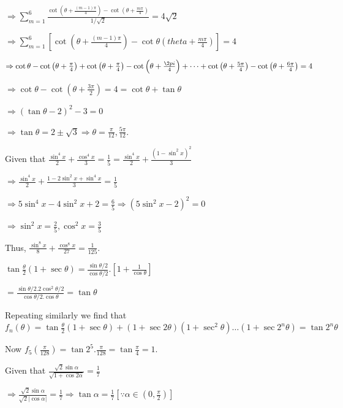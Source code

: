   $\Rightarrow \displaystyle\sum_{m = 1}^6\frac{\cot\left(\theta + \frac{(m - 1)\pi}{4}\right)
    - \cot\left(\theta + \frac{m\pi}{4}\right)}{1/\sqrt{2}} = 4\sqrt{2}$

  $\Rightarrow \displaystyle\sum_{m = 1}^6\left[\cot\left(\theta + \frac{(m - 1)\pi}{4}\right)
    - \cot\theta\left(theta + \frac{m\pi}{4}\right)\right] = 4$

  $\Rightarrow \cot\theta - \cot\left(\theta + \frac{\pi}{4}\right) + \cot\left(\theta
  + \frac{\pi}{4}\right) - \cot\left(\theta + \frac{\2pi}{4}\right) + \cdots + \cot\left(\theta
  + \frac{5\pi}{4}\right) - \cot\left(\theta + \frac{6\pi}{4}\right) = 4$

  $\Rightarrow \cot\theta - \cot\left(\theta + \frac{3\pi}{2}\right) = 4 = \cot\theta + \tan\theta$

  $\Rightarrow (\tan\theta - 2)^2 - 3 = 0$

  $\Rightarrow \tan\theta = 2\pm\sqrt{3}\Rightarrow \theta = \frac{\pi}{12}, \frac{5\pi}{12}$.
\item Given that $\frac{\sin^4x}{2} + \frac{\cos^4x}{3} = \frac{1}{5} = \frac{\sin^4x}{2} + \frac{\left(1
  - \sin^2x\right)^2}{3}$

  $\Rightarrow \frac{\sin^4x}{2} + \frac{1 - 2\sin^2x + \sin^4x}{3} = \frac{1}{5}$

  $\Rightarrow 5\sin^4x - 4\sin^2x + 2 = \frac{6}{5} \Rightarrow \left(5\sin^2x - 2\right)^2 = 0$

  $\Rightarrow \sin^2x = \frac{2}{5}, \cos^2x = \frac{3}{5}$

  Thus, $\frac{\sin^8x}{8} + \frac{\cos^8x}{27} = \frac{1}{125}$.
\item $\tan\frac{\theta}{2}(1 + \sec\theta) = \frac{\sin\theta/2}{\cos\theta/2}.\left[1
  + \frac{1}{\cos\theta}\right]$

  $= \frac{\sin\theta/2.2\cos^2\theta/2}{\cos\theta/2.\cos\theta} = \tan\theta$

  Repeating similarly we find that $f_n(\theta) = \tan\frac{\theta}{2}(1 + \sec\theta) + (1
  + \sec2\theta)\left(1 + \sec^2\theta\right)\ldots\left(1 + \sec2^n\theta\right) = \tan2^n\theta$

  Now $f_5\left(\frac{\pi}{128}\right) = \tan2^5.\frac{\pi}{128} = \tan\frac{\pi}{4} = 1$.
\item Given that $\frac{\sqrt{2}\sin\alpha}{\sqrt{1 + \cos2\alpha}} = \frac{1}{7}$

  $\Rightarrow \frac{\sqrt{2}\sin\alpha}{\sqrt{2}|\cos\alpha|} = \frac{1}{7}\Rightarrow \tan\alpha
  = \frac{1}{7}[\because \alpha\in\left(0, \frac{\pi}{2}\right)]$

